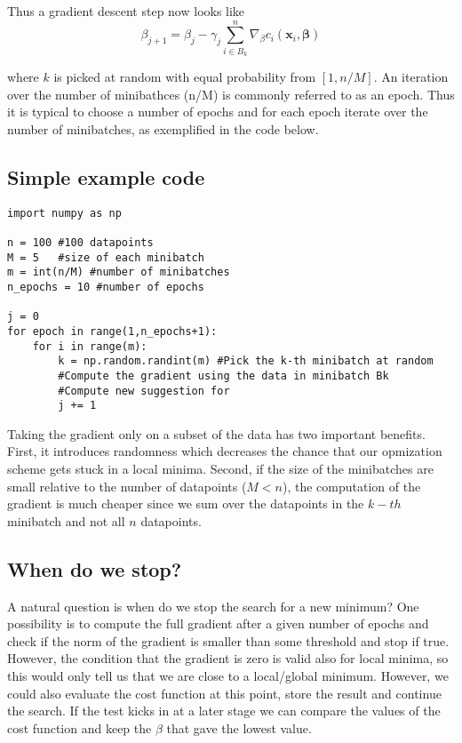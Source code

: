 \documentclass[%
oneside,                 %
final,                   %
10pt]{article}
\begin{document}
Thus a gradient descent step now looks like 
\[
\beta_{j+1} = \beta_j - \gamma_j \sum_{i \in B_k}^n \nabla_\beta c_i(\mathbf{x}_i,
\mathbf{\beta})
\]

where $k$ is picked at random with equal
probability from $[1,n/M]$. An iteration over the number of
minibathces (n/M) is commonly referred to as an epoch. Thus it is
typical to choose a number of epochs and for each epoch iterate over
the number of minibatches, as exemplified in the code below.

\subsection*{Simple example code}

\begin{verbatim}
import numpy as np 

n = 100 #100 datapoints 
M = 5   #size of each minibatch
m = int(n/M) #number of minibatches
n_epochs = 10 #number of epochs

j = 0
for epoch in range(1,n_epochs+1):
    for i in range(m):
        k = np.random.randint(m) #Pick the k-th minibatch at random
        #Compute the gradient using the data in minibatch Bk
        #Compute new suggestion for 
        j += 1
\end{verbatim}

Taking the gradient only on a subset of the data has two important
benefits. First, it introduces randomness which decreases the chance
that our opmization scheme gets stuck in a local minima. Second, if
the size of the minibatches are small relative to the number of
datapoints ($M <  n$), the computation of the gradient is much
cheaper since we sum over the datapoints in the $k-th$ minibatch and not
all $n$ datapoints.

\subsection*{When do we stop?}

A natural question is when do we stop the search for a new minimum?
One possibility is to compute the full gradient after a given number
of epochs and check if the norm of the gradient is smaller than some
threshold and stop if true. However, the condition that the gradient
is zero is valid also for local minima, so this would only tell us
that we are close to a local/global minimum. However, we could also
evaluate the cost function at this point, store the result and
continue the search. If the test kicks in at a later stage we can
compare the values of the cost function and keep the $\beta$ that
gave the lowest value.
\end{document}
